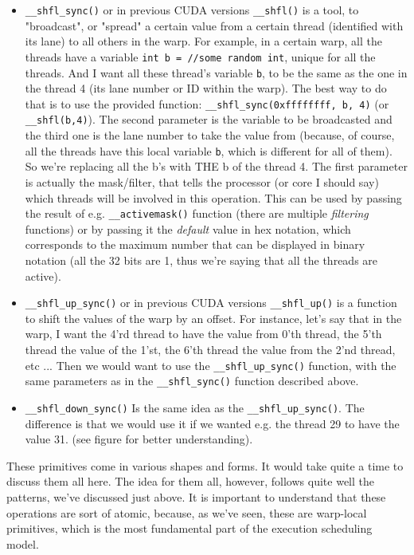 \begin{itemize}
    \item \verb|__shfl_sync()| or in previous CUDA versions \verb|__shfl()| is a tool, to "broadcast", or "spread"
        a certain value from a certain thread (identified with its lane) to all others in the warp. For example, 
        in a certain warp, all the threads have a variable \verb|int b = //some random int|, unique for all 
        the threads. And I want all these thread's variable \verb|b|, to be the same as the one in the thread 
        4 (its lane number or ID within the warp). The best way to do that is to use the provided function:
        \verb|__shfl_sync(0xffffffff, b, 4)| (or \verb|__shfl(b,4)|). The second parameter is the variable to be 
        broadcasted and the third one is the lane number to take the value from (because, of course, all the 
        threads have this local variable \verb|b|, which is different for all of them). So we're replacing all the 
        b's with THE b of the thread 4. The first parameter is actually the mask/filter, that tells the 
        processor (or core I should say) which threads will be involved in this operation. This can be used 
        by passing the result of e.g. \verb|__activemask()| function (there are multiple \textit{filtering} functions)
        or by passing it the \textit{default} value in hex notation, which corresponds to the maximum number 
        that can be displayed in binary notation (all the 32 bits are 1, thus we're saying that all the threads are active).

    \item \verb|__shfl_up_sync()| or in previous CUDA versions \verb|__shfl_up()| is a function to 
        shift the values of the warp by an offset. For instance, let's say that in the warp, I want 
        the 4'rd thread to have the value from 0'th thread, the 5'th thread the value of the 1'st, the 6'th 
        thread the value from the 2'nd thread, etc ... Then we would want to use the \verb|__shfl_up_sync()| 
        function, with the same parameters as in the \verb|__shfl_sync()| function described above.
    \item \verb|__shfl_down_sync()| Is the same idea as the \verb|__shfl_up_sync()|. The difference is that 
        we would use it if we wanted e.g. the thread 29 to have the value 31. (see figure for better understanding).
\end{itemize}

These primitives come in various shapes and forms. It would take quite a time
to discuss them all here. The idea for them all, however, follows quite well the 
patterns, we've discussed just above. It is important to understand that these operations
are sort of atomic, because, as we've seen, these are warp-local primitives, which is the most 
fundamental part of the execution scheduling model.


